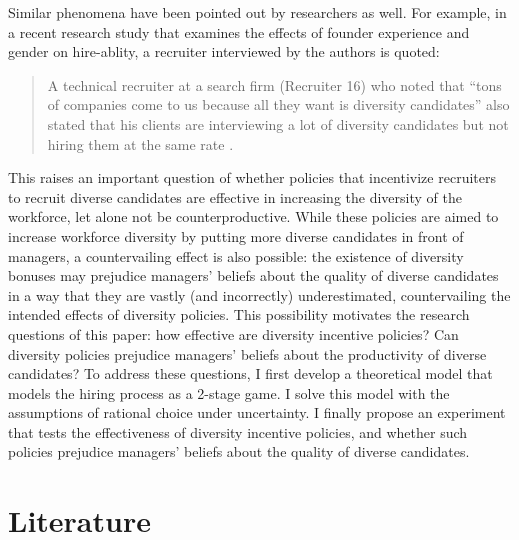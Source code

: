 \documentclass[11pt]{article}
\begin{document}
Similar phenomena have been pointed out by researchers as well. For example, in a recent research study that examines the effects of founder experience and gender on hire-ablity, a recruiter interviewed by the authors is quoted:

\begin{quote}
    A technical recruiter at a search firm (Recruiter 16) who noted that “tons of companies come to us because all they want is diversity candidates” also stated that his clients are interviewing a lot of diversity candidates but not hiring them at the same rate \parencite{botelho_founder_2019}.

\end{quote}

This raises an important question of whether policies that incentivize recruiters to recruit diverse candidates are effective in increasing the diversity of the workforce, let alone not be counterproductive. While these policies are aimed to increase workforce diversity by putting more diverse candidates in front of managers, a countervailing effect is also possible: the existence of diversity bonuses may prejudice managers' beliefs about the quality of diverse candidates in a way that they are vastly (and incorrectly) underestimated, countervailing the intended effects of diversity policies. This possibility motivates the research questions of this paper: how effective are diversity incentive policies? Can diversity policies prejudice managers' beliefs about the productivity of diverse candidates? To address these questions, I first develop a theoretical model that models the hiring process as a 2-stage game. I solve this model with the assumptions of rational choice under uncertainty. I finally propose an experiment that tests the effectiveness of diversity incentive policies, and whether such policies prejudice managers' beliefs about the quality of diverse candidates.

\section{Literature}
\end{document}
